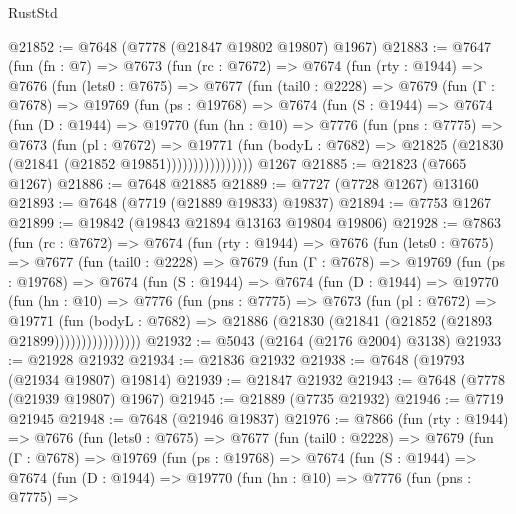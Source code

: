 \begin{lexlean}{RustStd}
\begin{coremodule}
@21852 := @7648 (@7778 (@21847 @19802 @19807) @1967)
@21883 := @7647
    (fun (fn : @7) =>
    @7673
      (fun (rc : @7672) =>
      @7674
        (fun (rty : @1944) =>
        @7676
          (fun (lets0 : @7675) =>
          @7677
            (fun (tail0 : @2228) =>
            @7679
              (fun (Γ : @7678) =>
              @19769
                (fun (ps : @19768) =>
                @7674
                  (fun (S : @1944) =>
                  @7674
                    (fun (D : @1944) =>
                    @19770
                      (fun (hn : @10) =>
                      @7776
                        (fun (pns : @7775) =>
                        @7673
                          (fun (pl : @7672) =>
                          @19771
                            (fun (bodyL : @7682) =>
                            @21825 (@21830 (@21841 (@21852 @19851))))))))))))))))
    @1267
@21885 := @21823 (@7665 @1267)
@21886 := @7648 @21885
@21889 := @7727 (@7728 @1267) @13160
@21893 := @7648 (@7719 (@21889 @19833) @19837)
@21894 := @7753 @1267
@21899 := @19842 (@19843 @21894 @13163 @19804 @19806)
@21928 := @7863
    (fun (rc : @7672) =>
    @7674
      (fun (rty : @1944) =>
      @7676
        (fun (lets0 : @7675) =>
        @7677
          (fun (tail0 : @2228) =>
          @7679
            (fun (Γ : @7678) =>
            @19769
              (fun (ps : @19768) =>
              @7674
                (fun (S : @1944) =>
                @7674
                  (fun (D : @1944) =>
                  @19770
                    (fun (hn : @10) =>
                    @7776
                      (fun (pns : @7775) =>
                      @7673
                        (fun (pl : @7672) =>
                        @19771
                          (fun (bodyL : @7682) =>
                          @21886 (@21830 (@21841 (@21852 (@21893 @21899))))))))))))))))
@21932 := @5043 (@2164 (@2176 @2004) @3138)
@21933 := @21928 @21932
@21934 := @21836 @21932
@21938 := @7648 (@19793 (@21934 @19807) @19814)
@21939 := @21847 @21932
@21943 := @7648 (@7778 (@21939 @19807) @1967)
@21945 := @21889 (@7735 @21932)
@21946 := @7719 @21945
@21948 := @7648 (@21946 @19837)
@21976 := @7866
    (fun (rty : @1944) =>
    @7676
      (fun (lets0 : @7675) =>
      @7677
        (fun (tail0 : @2228) =>
        @7679
          (fun (Γ : @7678) =>
          @19769
            (fun (ps : @19768) =>
            @7674
              (fun (S : @1944) =>
              @7674
                (fun (D : @1944) =>
                @19770
                  (fun (hn : @10) =>
                  @7776
                    (fun (pns : @7775) =>

\end{coremodule}
\end{lexlean}
